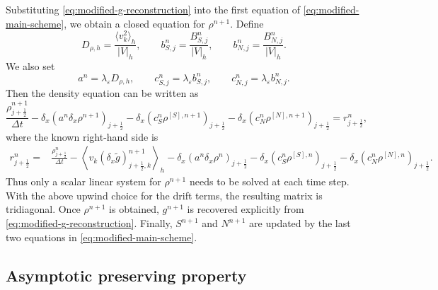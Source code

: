 \documentclass[11pt,twoside]{article}
\theoremstyle{plain}
\theoremstyle{nonumberplain}
\begin{document}
{Substituting \eqref{eq:modified-g-reconstruction} into the first equation
of \eqref{eq:modified-main-scheme}, we obtain a closed equation for
\(\rho^{n+1}\). Define
\[
D_{\rho,h}
=
\frac{\langle v_k^2\rangle_h}{|V|_h},
\qquad
b_{S,j}^n
=
\frac{B_{S,j}^n}{|V|_h},
\qquad
b_{N,j}^n
=
\frac{B_{N,j}^n}{|V|_h}.
\]
We also set
\[
a^n=\lambda_\varepsilon D_{\rho,h},
\qquad
c_{S,j}^n=\lambda_\varepsilon b_{S,j}^n,
\qquad
c_{N,j}^n=\lambda_\varepsilon b_{N,j}^n.
\]
Then the density equation can be written as
\begin{equation}\label{eq:modified-rho-equation-two-upwind}
\frac{\rho_{j+\frac12}^{n+1}}{\Delta t}
-
\delta_x\left(
a^n\delta_x\rho^{n+1}
\right)_{j+\frac12}
-
\delta_x\left(
c_S^n\rho^{[S],n+1}
\right)_{j+\frac12}
-
\delta_x\left(
c_N^n\rho^{[N],n+1}
\right)_{j+\frac12}
=
r_{j+\frac12}^n,
\end{equation}
where the known right-hand side is
\[
\begin{aligned}
r_{j+\frac12}^n
=&
\frac{\rho_{j+\frac12}^n}{\Delta t}
-
\left\langle
v_k(\delta_x\widetilde g)_{j+\frac12,k}^{n+1}
\right\rangle_h
-
\delta_x\left(
a^n\delta_x\rho^n
\right)_{j+\frac12}
-
\delta_x\left(
c_S^n\rho^{[S],n}
\right)_{j+\frac12}
-
\delta_x\left(
c_N^n\rho^{[N],n}
\right)_{j+\frac12}.
\end{aligned}
\]
Thus only a scalar linear system for \(\rho^{n+1}\) needs to be solved at
each time step. With the above upwind choice for the drift terms, the
resulting matrix is tridiagonal. Once \(\rho^{n+1}\) is obtained,
\(g^{n+1}\) is recovered explicitly from
\eqref{eq:modified-g-reconstruction}. Finally, \(S^{n+1}\) and \(N^{n+1}\)
are updated by the last two equations in \eqref{eq:modified-main-scheme}.


\subsection{Asymptotic preserving property}

}
\end{document}
